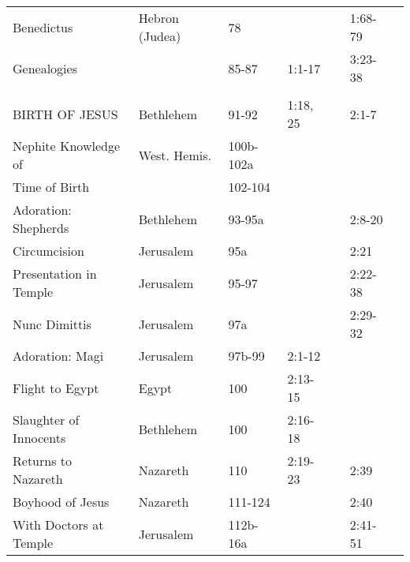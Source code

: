 \begin{longtable}[h]{lllllll}
\quad Benedictus                   & Hebron (Judea)      & 78         &                 &                 & 1:68-79              & \\
Genealogies                        &                     & 85-87      & 1:1-17          &                 & 3:23-38              & \\
\\
BIRTH OF JESUS                     & Bethlehem           & 91-92      & 1:18, 25        &                 & 2:1-7                & \\
\quad Nephite Knowledge of         & West. Hemis.        & 100b-102a  &                 &                 &                      & \\
\quad Time of Birth                &                     & 102-104    &                 &                 &                      & \\
Adoration: Shepherds               & Bethlehem           & 93-95a     &                 &                 & 2:8-20               & \\
Circumcision                       & Jerusalem           & 95a        &                 &                 & 2:21                 & \\
Presentation in Temple             & Jerusalem           & 95-97      &                 &                 & 2:22-38              & \\
\quad Nunc Dimittis                & Jerusalem           & 97a        &                 &                 & 2:29-32              & \\
Adoration: Magi                    & Jerusalem           & 97b-99     & 2:1-12          &                 &                      & \\
Flight to Egypt                    & Egypt               & 100        & 2:13-15         &                 &                      & \\
Slaughter of Innocents             & Bethlehem           & 100        & 2:16-18         &                 &                      & \\
Returns to Nazareth                & Nazareth            & 110        & 2:19-23         &                 & 2:39                 & \\
Boyhood of Jesus                   & Nazareth            & 111-124    &                 &                 & 2:40                 & \\
With Doctors at Temple             & Jerusalem           & 112b-16a   &                 &                 & 2:41-51              & \\

\end{longtable}
